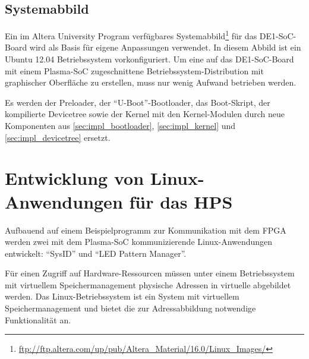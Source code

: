 
\subsection{Systemabbild}

Ein im Altera University Program verfügbares Systemabbild\footnote{\url{ftp://ftp.altera.com/up/pub/Altera_Material/16.0/Linux_Images/}} für das DE1-SoC-Board wird als Basis für eigene Anpassungen verwendet. In diesem Abbild ist ein Ubuntu 12.04 Betriebssystem vorkonfiguriert. Um eine auf das DE1-SoC-Board mit einem Plasma-\gls{SoC} zugeschnittene Betriebssystem-Distribution mit graphischer Oberfläche zu erstellen, muss nur wenig Aufwand betrieben werden.

Es werden der Preloader, der \enquote{U-Boot}-Bootloader, das Boot-Skript, der kompilierte Devicetree sowie der Kernel mit den Kernel-Modulen durch neue Komponenten aus \cref{sec:impl_bootloader}, \cref{sec:impl_kernel} und \cref{sec:impl_devicetree} ersetzt.
%

\section{Entwicklung von Linux-Anwendungen für das HPS}
\label{sec:impl_develop_linux_sw_for_de1_soc}

Aufbauend auf einem Beispielprogramm zur Kommunikation mit dem \gls{FPGA} \cite[16ff]{manual:using_linux_on_de1_soc} werden zwei mit dem Plasma-\gls{SoC} kommunizierende Linux-Anwendungen entwickelt: \enquote{SysID} und \enquote{LED Pattern Manager}.

Für einen Zugriff auf Hardware-Ressourcen müssen unter einem Betriebssystem mit virtuellem Speichermanagement physische Adressen in virtuelle abgebildet werden. Das Linux-Betriebssystem ist ein System mit virtuellem Speichermanagement und bietet die zur Adressabbildung notwendige Funktionalität an. 

